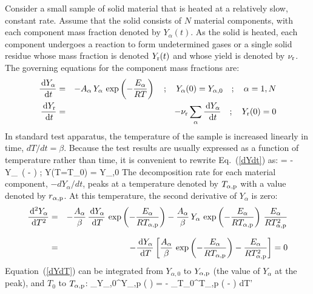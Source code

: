 \documentclass[11pt]{book}
\begin{document}
Consider a small sample of solid material that is heated at a relatively slow, constant rate. Assume that the solid consists of $N$ material components, with each component mass fraction denoted by $Y_\alpha(t)$. As the solid is heated, each component undergoes a reaction to form undetermined gases or a single solid residue whose mass fraction is denoted $Y_{\rm r}(t)$ and whose yield is denoted by $\nu_{\rm r}$. The governing equations for the component mass fractions are:
\begin{eqnarray}
   \frac{\,\mathrm{d} Y_\alpha}{\,\mathrm{d} t} &=& -A_\alpha \, Y_\alpha \, \exp \left( -\frac{E_\alpha}{RT} \right)    \quad ; \quad Y_\alpha(0) = Y_{\alpha,0} \quad ; \quad \alpha=1,N  \label{dYdt} \\
   \frac{\,\mathrm{d} Y_{\rm r}}{\,\mathrm{d} t} &=& -\nu_{\rm r}  \sum_\alpha \frac{\,\mathrm{d} Y_\alpha}{\,\mathrm{d} t}                                   \quad ; \quad Y_{\rm r}(0) = 0  \label{dYrdt}
\end{eqnarray}
In standard test apparatus, the temperature of the sample is increased linearly in time, $dT/dt=\beta$. Because the test results are usually expressed as a function of temperature rather than time, it is convenient to rewrite Eq.~(\ref{dYdt}) as:
\be
    = - \, Y_\alpha \, \exp \left( - \right)    \quad ; \quad Y(T=T_0) = Y_{\alpha,0}  \label{dYdT}
\ee
The decomposition rate for each material component, $-dY_\alpha/dt$, peaks at a temperature denoted by $T_{\alpha,{\rm p}}$ with a value denoted by $r_{\alpha,{\rm p}}$. At this temperature, the second derivative of $Y_\alpha$ is zero:
\begin{eqnarray}
   \frac{\,\mathrm{d}^2 Y_\alpha}{\,\mathrm{d} T^2} &=& -\frac{A_\alpha}{\beta} \, \frac{\,\mathrm{d} Y_\alpha}{\,\mathrm{d} T} \, \exp \left( -\frac{E_\alpha}{R T_{\alpha,{\rm p}} } \right) -
   \frac{A_\alpha}{\beta} \, Y_\alpha \, \exp \left( -\frac{E_\alpha}{R T_{\alpha,{\rm p}} } \right) \, \frac{E_\alpha}{R T_{\alpha,{\rm p}}^2} \nonumber \\[.1in]
   &=& -\frac{\,\mathrm{d} Y_\alpha}{\,\mathrm{d} T} \left[ \frac{A_\alpha}{\beta} \, \exp \left( -\frac{E_\alpha}{R T_{\alpha,{\rm p}} } \right) - \frac{E_\alpha}{R T_{\alpha,{\rm p}}^2} \right] = 0  \label{d2YdT2}
\end{eqnarray}
Equation~(\ref{dYdT}) can be integrated from $Y_{\alpha,0}$ to $Y_{\alpha,{\rm p}}$ (the value of $Y_\alpha$ at the peak), and $T_0$ to $T_{\alpha,{\rm p}}$:
\be
   \int_{Y_{\alpha,0}}^{Y_{\alpha,{\rm p}}} \left(  \right) = -  \int_{T_0}^{T_{\alpha,{\rm p}}} \exp \left( - \right) \; dT'
\end{document}
